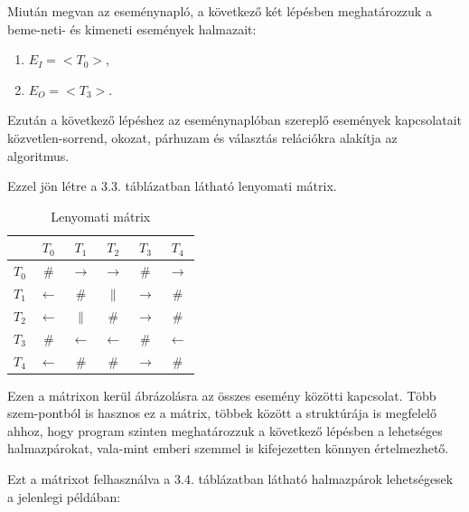 \begin{example}
	Miután megvan az eseménynapló, a következő két lépésben meghatározzuk a beme\hyp{}neti- és kimeneti események halmazait:
	\begin{enumerate}
		\item $E_I=<T_0>$,
		\item $E_O=<T_3>$.
	\end{enumerate}

	Ezután a következő lépéshez az eseménynaplóban szereplő események kapcsolatait közvetlen-sorrend, okozat, párhuzam és választás relációkra alakítja az algoritmus.

	Ezzel jön létre a 3.3. táblázatban látható lenyomati mátrix.
	
	\begin{table}[h]
	\begin{center}
	\caption{Lenyomati mátrix}
	\begin{tabular}{|c | c | c | c | c | c|}
		\hline
		\hspace{0.1cm} & $T_0$ & $T_1$ & $T_2$ & $T_3$ & $T_4$ \\
		\hline
		$T_0$ & \# & $\rightarrow$ & $\rightarrow$ & \# & $\rightarrow$ \\
		\hline
		$T_1$ & $\leftarrow$ & \# & $\parallel$ & $\rightarrow$ & \# \\
		\hline
		$T_2$ & $\leftarrow$ & $\parallel$ & \# & $\rightarrow$ & \# \\
		\hline
		$T_3$ & \# & $\leftarrow$ & $\leftarrow$ & \# & $\leftarrow$ \\
		\hline
		$T_4$ & $\leftarrow$ & \# & \# & $\rightarrow$ & \# \\
		\hline
	\end{tabular}
	\label{fig:planexample}
	\end{center}
	\end{table}

	Ezen a mátrixon kerül ábrázolásra az összes esemény közötti kapcsolat. Több szem\hyp{}pontból is hasznos ez a mátrix, többek között a struktúrája is megfelelő ahhoz, hogy program szinten meghatározzuk a következő lépésben a lehetséges halmazpárokat, vala\hyp{}mint emberi szemmel is kifejezetten könnyen értelmezhető.

	Ezt a mátrixot felhasználva a 3.4. táblázatban látható halmazpárok lehetségesek a jelenlegi példában:
	\newpage


\end{example}
